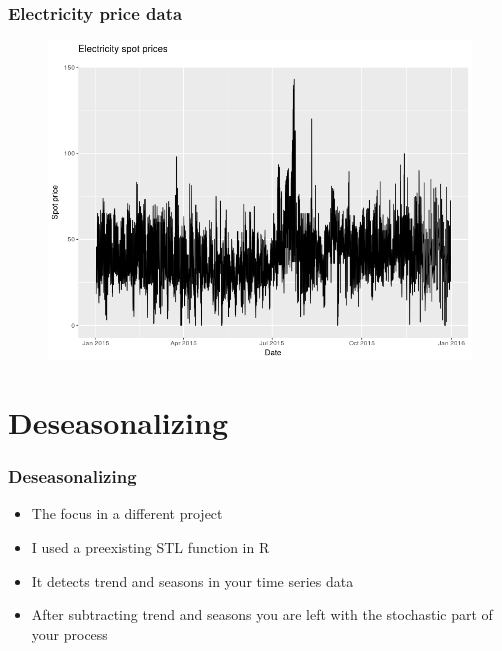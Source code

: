 \documentclass{beamer}
\begin{document}
\begin{frame}
\frametitle{Electricity price data}

\begin{figure}
\includegraphics[width=0.85\linewidth]{hourly_data.png}
\end{figure}

\end{frame}

\section{Deseasonalizing}

\begin{frame}
\frametitle{Deseasonalizing}
\begin{itemize}
\item The focus in a different project
\item I used a preexisting STL function in R
\item It detects trend and seasons in your time series data
\item After subtracting trend and seasons you are left with the stochastic part of your process
\end{itemize}
\end{frame}
\end{document}
